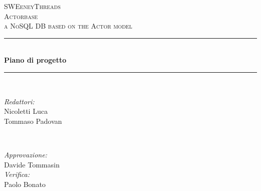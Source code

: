 \documentclass[a4paper]{article}
\begin{document}
	\begin{titlepage}
		\newcommand{\HRule}{\rule{\linewidth}{0.5mm}} 
		\center  
		
		\textsc{\LARGE SWEeneyThreads}\\[1.5cm] 
		\textsc{\Large Actorbase}\\[0.5cm] 
		\textsc{\large a NoSQL DB based on the Actor model}\\[0.5cm]
		
		
		\HRule \\[0.4cm]
		{ \huge \bfseries Piano di progetto}\\[0.4cm] 
		\HRule \\[1.5cm]
		
		\begin{minipage}{0.4\textwidth}
			\begin{flushleft} \large
				\emph{Redattori:}\\
				Nicoletti Luca\\
				Tommaso Padovan\\
			\end{flushleft}
		\end{minipage}
		~
		\begin{minipage}{0.4\textwidth}
			\begin{flushright} \large
				\emph{Approvazione:}\\
				Davide Tommasin\\
				\emph{Verifica:} \\
				Paolo Bonato\\
			\end{flushright}
		\end{minipage}
		

\end{titlepage}
\end{document}
